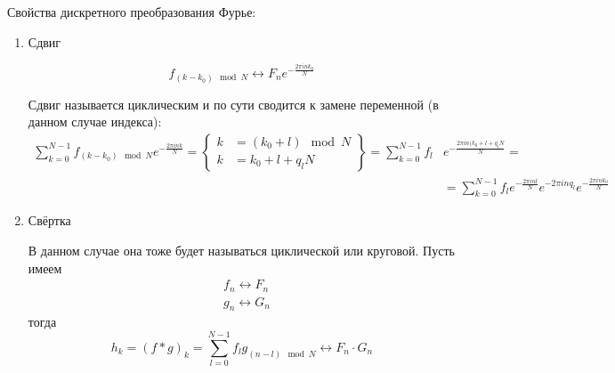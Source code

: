 Свойства дискретного преобразования Фурье:
\begin{enumerate}
\item Сдвиг

\begin{equation*}
f_{(k - k_0)\mod N} \longleftrightarrow F_n e^{- \frac{2 \pi i n k_0}{N}}
\end{equation*}

Сдвиг называется циклическим и по сути сводится к замене переменной (в данном случае индекса):
\begin{equation*}
\begin{aligned}
\sum\limits_{k = 0}^{N - 1} f_{(k - k_0)\mod N} e^{-\frac{2 \pi i n k}{N}} = \left\{
\begin{aligned}  k &= (k_0 + l) \mod N \\ k &= k_0 + l + q_ l N \end{aligned} \right\} = \sum\limits_{k = 0}^{N - 1} f_l &e^{-\frac{2 \pi i n (k_0 + l + q_lN}{N}} = \\ &=\sum\limits_{k = 0}^{N - 1} f_l e^{-\frac{2 \pi i n l}{N}}  e^{-2 \pi i n q_l}  e^{-\frac{2 \pi i n k_0}{N}}
\end{aligned}
\end{equation*}

\item Свёртка

В данном случае она тоже будет называться циклической или круговой. Пусть имеем
\begin{equation*}
\begin{aligned}
&f_n \longleftrightarrow F_n\\
&g_n \longleftrightarrow G_n
\end{aligned}
\end{equation*}
тогда 
\begin{equation*}
h_k = (f \ast g)_k = \sum\limits_{l = 0}^{N - 1} f_l g_{(n - l) \mod N} \longleftrightarrow F_n \cdot G_n
\end{equation*}
\end{enumerate}